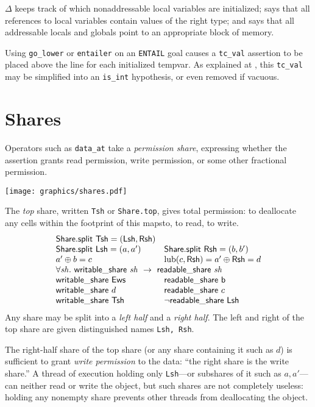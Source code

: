 \documentclass[12pt,fleqn,openany,oneside,showtrims]{memoir}
\newcommand{\ychapter}[2]{\chapter[#1]{#1}}
\begin{document}
$\Delta$
keeps track of which nonaddressable local variables are initialized;
says that all references to local variables
contain values of the right type;
and says that all addressable locals and globals point
to an appropriate block of memory.

Using \lstinline{go_lower} or \lstinline{entailer} on
an \lstinline{ENTAIL} goal causes a
\lstinline{tc_val} assertion to be placed above the line
for each initialized tempvar.
As explained at ,
this \lstinline{tc_val} may be simplified into
an \lstinline{is_int} hypothesis, or even removed if vacuous.



\ychapter{Shares}{(See PLCC Chapters~\ref{ch:shares},\ref{ch:share-model})}
\label{refcard:shares}
Operators such as \lstinline{data_at} take a
\emph{permission share}, expressing whether
the assertion grants read permission, write permission,
or some other fractional permission.

\centerline{\texttt{[image: graphics/shares.pdf]}}

The \emph{top} share, written \lstinline{Tsh} or
\lstinline{Share.top}, gives total permission: to deallocate any cells
within the footprint of this mapsto, to read, to write.
\[
\begin{array}{ll}
\mathsf{Share.split}~\mathsf{Tsh} = (\mathsf{Lsh},\mathsf{Rsh}) & \\
\mathsf{Share.split}~\mathsf{Lsh} = (a,a')  & \mathsf{Share.split}~\mathsf{Rsh} = (b,b') \\
a'\oplus b = c & \mathrm{lub}(c,\mathsf{Rsh})=a'\oplus \mathsf{Rsh}=d\\
\multicolumn{2}{l}{\forall \mathit{sh}.~\mathsf{writable\_share}~\mathit{sh}~\rightarrow~\mathsf{readable\_share}~\mathit{sh}}\\
\mathsf{writable\_share}~\mathsf{Ews} & \mathsf{readable\_share}~\mathsf{b} \\
\mathsf{writable\_share}~d & \mathsf{readable\_share}~c \\
\mathsf{writable\_share}~\mathsf{Tsh} &  \neg \mathsf{readable\_share}~\mathsf{Lsh} \\
\end{array}
\]
Any share may be split into a \emph{left half} and a \emph{right half}.
The left and right of the top share are given distinguished names
\lstinline{Lsh, Rsh}.

The right-half share of the top share (or any share containing it such
as $d$) is sufficient to grant \emph{write permission} to the data:
``the right share is the write share.''  A thread of execution holding
only \lstinline{Lsh}---or subshares of it such as $a,a'$---can neither
read or write the object, but such shares are not completely useless:
holding any nonempty share prevents other threads from deallocating
the object.
\end{document}
